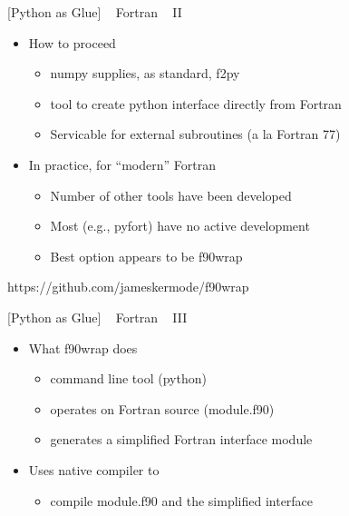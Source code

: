 \documentclass{article}
\begin{document}
    {[}Python as Glue{]} ~ Fortran ~ II

\begin{itemize}
\itemsep1pt\parskip0pt
\item
  How to proceed

  \begin{itemize}
  \itemsep1pt\parskip0pt
  \item
    numpy supplies, as standard, f2py
  \item
    tool to create python interface directly from Fortran
  \item
    Servicable for external subroutines (a la Fortran 77)
  \end{itemize}
\item
  In practice, for ``modern'' Fortran

  \begin{itemize}
  \itemsep1pt\parskip0pt
  \item
    Number of other tools have been developed
  \item
    Most (e.g., pyfort) have no active development
  \item
    Best option appears to be f90wrap
  \end{itemize}
\end{itemize}

https://github.com/jameskermode/f90wrap

    {[}Python as Glue{]} ~ Fortran ~ III

\begin{itemize}
\itemsep1pt\parskip0pt
\item
  What f90wrap does

  \begin{itemize}
  \itemsep1pt\parskip0pt
  \item
    command line tool (python)
  \item
    operates on Fortran source (module.f90)
  \item
    generates a simplified Fortran interface module
  \end{itemize}
\item
  Uses native compiler to

  \begin{itemize}
  \itemsep1pt\parskip0pt
  \item
    compile module.f90 and the simplified interface
  \end{itemize}
\end{itemize}
\end{document}
